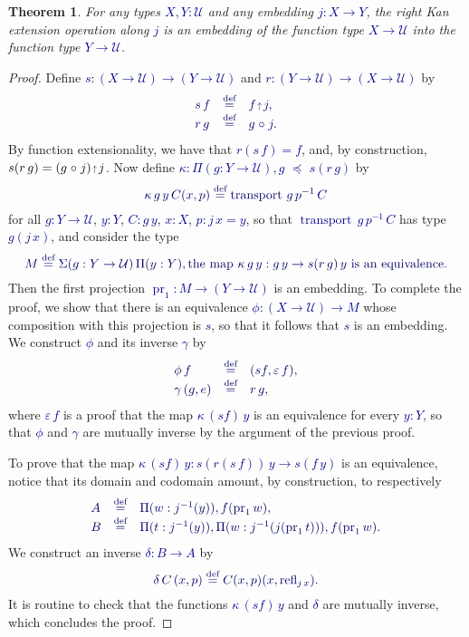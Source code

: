 \documentclass[10pt]{article}
\newcommand{\db}{\textcolor{darkblue}}
\newcommand{\m}[1]{\db{$#1$}}
\newcommand{\M}[1]{\[\db{#1}\]}
\newcommand{\transport}{\operatorname{transport}}
\newcommand{\fst}{\operatorname{pr}_1}
\newcommand{\comp}{\mathrel{\circ}}
\newcommand{\U}{\mathcal{U}}
\newcommand{\refl}{\operatorname{refl}}
\newcommand{\eqdef}{\overset{\text{def}}{=}}
\newcommand{\eup}{\scaleobj{0.7}{\,\uparrow\,}}
\newcommand{\wps}{\mathrel{\,\,\preceq\,\,}}
\newtheorem{theorem}[numbered]{Theorem}
\theoremstyle{definition}
\begin{document}
\begin{theorem}
For any types \m{X,Y:\U} and any embedding \m{j : X \to Y}, the right Kan extension operation along \m{j} is an embedding of the function type \m{X \to \U} into the function type \m{Y \to \U}.
\end{theorem}
\begin{proof}
  Define \m{s : (X \to \U) \to (Y \to \U)} and \m{r : (Y \to \U) \to (X \to \U)} by
  \M{
    \begin{array}{lll}
      s \, f & \eqdef & f \eup j, \\
      r \,  g & \eqdef & g \comp j.
    \end{array}
  }
  By function extensionality, we have that \m{r (s \, f) = f},
  and, by construction, \m{s (r \, g) = (g \comp j) \eup
    j}. Now define \m{\kappa : \Pi (g : Y \to \U), g \wps s(r \,g)
    } by
  \M{
    \kappa \, g \, y \, C (x , p) \eqdef \transport \, g \, p^{-1} \, C
  }
  for all \m{g : Y \to \U}, \m{y : Y}, \m{C : g \, y}, \m{x : X}, \m{p : j \, x = y}, so that
  \m{\transport \, g \, p^{-1} \, C} has type \m{g (j \, x) },
  and consider the type
  \M{
    M \eqdef \Sigma (g : Y \to \U)\,\Pi(y:Y), \text{the map \m{\kappa \, g \, y : g \, y \to s (r \, g) \,y} is an equivalence.}
  }
  Then the first projection \m{\fst : M \to (Y \to \U)} is an embedding.  To complete the proof,
  we show that there is an equivalence \m{\phi : (X \to \U) \to M}
  whose composition with this projection is \m{s}, so that it follows that \m{s}
  is an embedding.  We
  construct \m{\phi} and its inverse \m{\gamma} by
  \M{
    \begin{array}{lll}
      \phi \, f & \eqdef & (s f , \varepsilon \, f), \\
      \gamma \, (g , e) & \eqdef & r \, g,
    \end{array}
  }
  where \m{\varepsilon \, f} is a proof that the map \m{\kappa \, (s
    f) \, y} is an equivalence for every \m{y : Y}, so that \m{\phi}
  and \m{\gamma} are mutually inverse by the argument of the previous
  proof.

  To prove that the map \m{\kappa \, (s f) \, y : s(r(s \,
    f)) \, y \to s (f \, y)} is an equivalence, notice that its domain and
  codomain amount, by construction, to respectively
  \M{
    \begin{array}{lll}
      A & \eqdef & \Pi (w : j^{-1}(y)), f(\fst w), \\
      B & \eqdef & \Pi (t : j^{-1}(y)), \Pi (w : j^{-1}(j (\fst t))), f (\fst w).
    \end{array}
  }
  We construct an inverse \m{\delta : B \to A} by
  \M{
    \delta \, C \, (x , p) \eqdef C (x , p) (x , \refl_{j \, x}).
  }
  It is routine to check that the functions \m{\kappa \, (s f) \, y}
  and \m{\delta} are mutually inverse, which concludes the proof.
\end{proof}
\end{document}
